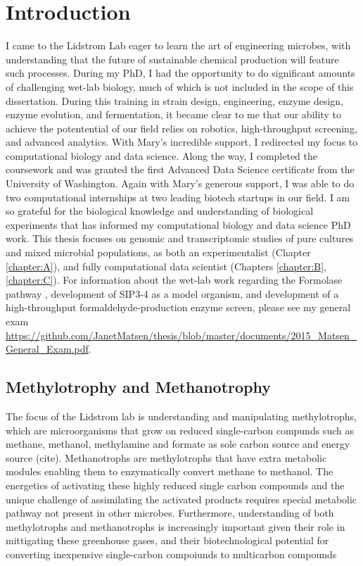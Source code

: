 \chapter{Introduction}

I came to the Lidstrom Lab eager to learn the art of engineering microbes, with understanding that the future of sustainable chemical production will feature such processes.
During my PhD, I had the opportunity to do significant amounts of challenging wet-lab biology, much of which is not included in the scope of this dissertation.
During this training in strain design, engineering, enzyme design, enzyme evolution, and fermentation, it became clear to me that our ability to achieve the potentential of our field relies on robotics, high-throughput screening, and advanced analytics.
With Mary's incredible support, I redirected my focus to computational biology and data science.
Along the way, I completed the coursework and was granted the first Advanced Data Science certificate from the University of Washington.
Again with Mary's generous support, I was able to do two computational internships at two leading biotech startups in our field.
I am so grateful for the biological knowledge and understanding of biological experiments that has informed my computational biology and data science PhD work.
This thesis focuses on genomic and transcriptomic studies of pure cultures and mixed microbial populations, as both an experimentalist (Chapter \ref{chapter:A}), and fully computational data scientist (Chapters \ref{chapter:B}, \ref{chapter:C}).
For information about the wet-lab work regarding the Formolase pathway \cite{siegel2015}, development of SIP3-4 as a model organism, and development of a high-throughput formaldehyde-production enzyme screen, please see my general exam \url{https://github.com/JanetMatsen/thesis/blob/master/documents/2015_Matsen_General_Exam.pdf}.

\section{Methylotrophy and Methanotrophy}
The focus of the Lidstrom lab is understanding and manipulating methylotrophs, which are microorganisms that grow on reduced single-carbon compunds such as methane, methanol, methylamine and formate as sole carbon source and energy source (cite).
Methanotrophs are methylotrophs that have extra metabolic modules enabling them to enzymatically convert methane to methanol.
The energetics of activating these highly reduced single carbon compounds and the unique challenge of assimilating the activated products requires special metabolic pathway not present in other microbes.
Furthermore, understanding of both methylotrophs and methanotrophs is increasingly important given their role in mittigating these greenhouse gases, and their biotechnological potential for converting inexpensive single-carbon compoiunds to multicarbon compounds

